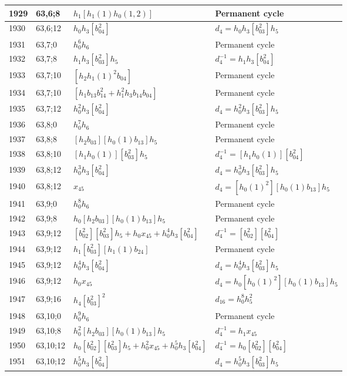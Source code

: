 \documentclass{article}
\begin{document}
\begin{longtable}{|l|l|>{\raggedright\arraybackslash}p{6cm}|>{\raggedright\arraybackslash}p{6cm}|}
\hline
1929 & 63,6;8 & $h_1[h_1(1)h_0(1, 2)]$ & Permanent cycle\\
\hline
1930 & 63,6;12 & $h_0h_3[b_{04}^2]$ &$d_{4}=h_0h_3[b_{03}^2]h_5$\\
\hline
1931 & 63,7;0 & $h_0^6h_6$ & Permanent cycle\\
\hline
1932 & 63,7;8 & $h_1h_3[b_{03}^2]h_5$ & $d_{4}^{-1}=h_1h_3[b_{04}^2]$\\
\hline
1933 & 63,7;10 & $[h_2h_1(1)^2b_{04}]$ & Permanent cycle\\
1934 & 63,7;10 & $[h_1b_{13}b_{14}^2 + h_1^2h_3b_{14}b_{04}]$ & Permanent cycle\\
\hline
1935 & 63,7;12 & $h_0^2h_3[b_{04}^2]$ &$d_{4}=h_0^2h_3[b_{03}^2]h_5$\\
\hline
1936 & 63,8;0 & $h_0^7h_6$ & Permanent cycle\\
\hline
1937 & 63,8;8 & $[h_2b_{03}][h_0(1)b_{13}]h_5$ & Permanent cycle\\
\hline
1938 & 63,8;10 & $[h_1h_0(1)][b_{03}^2]h_5$ & $d_{4}^{-1}=[h_1h_0(1)][b_{04}^2]$\\
\hline
1939 & 63,8;12 & $h_0^3h_3[b_{04}^2]$ &$d_{4}=h_0^3h_3[b_{03}^2]h_5$\\
1940 & 63,8;12 & $x_{45}$ &$d_{4}=[h_0(1)^2][h_0(1)b_{13}]h_5$\\
\hline
1941 & 63,9;0 & $h_0^8h_6$ & Permanent cycle\\
\hline
1942 & 63,9;8 & $h_0[h_2b_{03}][h_0(1)b_{13}]h_5$ & Permanent cycle\\
\hline
1943 & 63,9;12 & $[b_{02}^2][b_{03}^2]h_5 + h_0x_{45} + h_0^4h_3[b_{04}^2]$ & $d_{4}^{-1}=[b_{02}^2][b_{04}^2]$\\
1944 & 63,9;12 & $h_1[b_{03}^2][h_1(1)b_{24}]$ & Permanent cycle\\
1945 & 63,9;12 & $h_0^4h_3[b_{04}^2]$ &$d_{4}=h_0^4h_3[b_{03}^2]h_5$\\
1946 & 63,9;12 & $h_0x_{45}$ &$d_{4}=h_0[h_0(1)^2][h_0(1)b_{13}]h_5$\\
\hline
1947 & 63,9;16 & $h_4[b_{03}^2]^2$ &$d_{16}=h_0^8h_5^2$\\
\hline
1948 & 63,10;0 & $h_0^9h_6$ & Permanent cycle\\
\hline
1949 & 63,10;8 & $h_0^2[h_2b_{03}][h_0(1)b_{13}]h_5$ & $d_{4}^{-1}=h_1x_{45}$\\
\hline
1950 & 63,10;12 & $h_0[b_{02}^2][b_{03}^2]h_5 + h_0^2x_{45} + h_0^5h_3[b_{04}^2]$ & $d_{4}^{-1}=h_0[b_{02}^2][b_{04}^2]$\\
1951 & 63,10;12 & $h_0^5h_3[b_{04}^2]$ &$d_{4}=h_0^5h_3[b_{03}^2]h_5$\\

\end{longtable}
\end{document}
